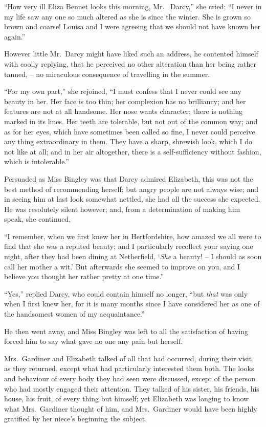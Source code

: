 “How very ill Eliza Bennet looks this morning, Mr.\ %
Darcy,” she cried; “I never in my life saw any one so
much altered as she is since the winter. She is grown
so brown and coarse! Louisa and I were agreeing that
we should not have known her again.”

However little Mr.\ Darcy might have liked such an
address, he contented himself with coolly replying, that
he perceived no other alteration than her being rather
tanned, -- no miraculous consequence of travelling in the
summer.

“For my own part,” she rejoined, “I must confess that
I never could see any beauty in her. Her face is too thin;
her complexion has no brilliancy; and her features are
not at all handsome. Her nose wants character; there is
nothing marked in its lines. Her teeth are tolerable, but
not out of the common way; and as for her eyes, which
have sometimes been called so fine, I never could perceive
any thing extraordinary in them. They have a sharp,
shrewish look, which I do not like at all; and in her
air altogether, there is a self-sufficiency without fashion,
which is intolerable.”

Persuaded as Miss Bingley was that Darcy admired
Elizabeth, this was not the best method of recommending
herself; but angry people are not always wise; and in
seeing him at last look somewhat nettled, she had all
the success she expected. He was resolutely silent however;
and, from a determination of making him speak,
she continued,

“I remember, when we first knew her in Hertfordshire,
how amazed we all were to find that she was a reputed
beauty; and I particularly recollect your saying one
night, after they had been dining at Netherfield, ‘\textit{She}
a beauty! -- I should as soon call her mother a wit.’ But
afterwards she seemed to improve on you, and I believe
you thought her rather pretty at one time.”

“Yes,” replied Darcy, who could contain himself no
longer, “but \textit{that} was only when I first knew her, for it is
many months since I have considered her as one of the
handsomest women of my acquaintance.”

He then went away, and Miss Bingley was left to all
the satisfaction of having forced him to say what gave
no one any pain but herself.

Mrs.\ Gardiner and Elizabeth talked of all that had
occurred, during their visit, as they returned, except what
had particularly interested them both. The looks and
behaviour of every body they had seen were discussed,
except of the person who had mostly engaged their attention.
They talked of his sister, his friends, his house, his
fruit, of every thing but himself; yet Elizabeth was
longing to know what Mrs.\ Gardiner thought of him,
and Mrs.\ Gardiner would have been highly gratified by
her niece’s beginning the subject.

